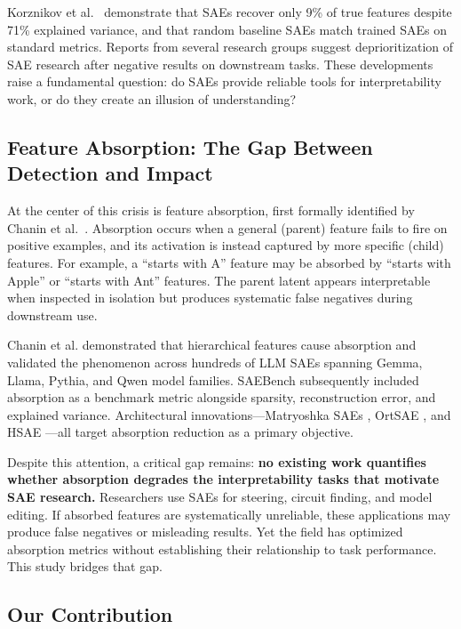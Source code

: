 \documentclass{article}
\begin{document}
Korznikov et al.~\cite{korznikov2025ort} demonstrate that SAEs recover only 9\% of true features despite 71\% explained variance, and that random baseline SAEs match trained SAEs on standard metrics. Reports from several research groups suggest deprioritization of SAE research after negative results on downstream tasks. These developments raise a fundamental question: do SAEs provide reliable tools for interpretability work, or do they create an illusion of understanding?

\subsection{Feature Absorption: The Gap Between Detection and Impact}

At the center of this crisis is feature absorption, first formally identified by Chanin et al.~\cite{chanin2024quantifying}. Absorption occurs when a general (parent) feature fails to fire on positive examples, and its activation is instead captured by more specific (child) features. For example, a ``starts with A'' feature may be absorbed by ``starts with Apple'' or ``starts with Ant'' features. The parent latent appears interpretable when inspected in isolation but produces systematic false negatives during downstream use.

Chanin et al. demonstrated that hierarchical features cause absorption and validated the phenomenon across hundreds of LLM SAEs spanning Gemma, Llama, Pythia, and Qwen model families. SAEBench \cite{karvonen2025saebench} subsequently included absorption as a benchmark metric alongside sparsity, reconstruction error, and explained variance. Architectural innovations---Matryoshka SAEs \cite{bussmann2025matryoshka}, OrtSAE \cite{korznikov2025ort}, and HSAE \cite{luo2026hsae}---all target absorption reduction as a primary objective.

Despite this attention, a critical gap remains: \textbf{no existing work quantifies whether absorption degrades the interpretability tasks that motivate SAE research.} Researchers use SAEs for steering, circuit finding, and model editing. If absorbed features are systematically unreliable, these applications may produce false negatives or misleading results. Yet the field has optimized absorption metrics without establishing their relationship to task performance. This study bridges that gap.

\subsection{Our Contribution}
\end{document}
